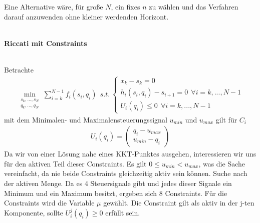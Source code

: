 \documentclass[12pt,a4paper]{article}
\begin{document}
  Eine Alternative wäre, für große $N$, ein fixes $n$ zu wählen und das Verfahren darauf anzuwenden ohne kleiner werdenden Horizont.\\
  \\
  \begin{large}
  \textbf{Riccati mit Constraints}
  \end{large} \\
  Betrachte
  \begin{align*}
  \min_{\begin{array}{c} s_{k},...,s_{N}\\ q_{k},...,q_{N} \end{array}} \sum_{i=k}^{N-1} f_{i}(s_{i},q_{i}) \ \  
  s.t. \ \left\lbrace \begin{array}{c}
  x_{k} - s_{k} = 0 \\
  h_i (s_i ,q_i ) - s_{i+1} = 0 \ \ \forall i = k, ... , N-1 \\
  U_i(q_i) \leq 0 \ \ \forall i = k, ... , N-1 \end{array} \right. 
  \end{align*}
  mit dem Minimalen- und Maximalensteuerungssignal $ u_{min} $ und $u_{max}$ gilt für $C_i $
  \begin{align*}
  U_i(q_i) = \left( \begin{array}{c}
  q_i - u_{max} \\
  u_{min} - q_i    
  \end{array} \right)
  \end{align*}
  Da wir von einer Lösung nahe eines KKT-Punktes ausgehen, interessieren wir uns für den aktiven Teil dieser Constraints. Es gilt $ 0 \leq u_{min} < u_{max}$, was die Sache vereinfacht, da nie beide Constraints gleichzeitig aktiv sein können.
  Suche nach der aktiven Menge. Da es 4 Steuersignale gibt und jedes dieser Signale ein Minimum und ein Maximum besitzt, ergeben sich 8 Constraints. Für die Constraints wird die Variable $ \mu $ gewählt.
  Die Constraint gilt als aktiv in der j-ten Komponente, sollte $U_i^j(q_i) \geq 0$ erfüllt sein.
  
\end{document}
